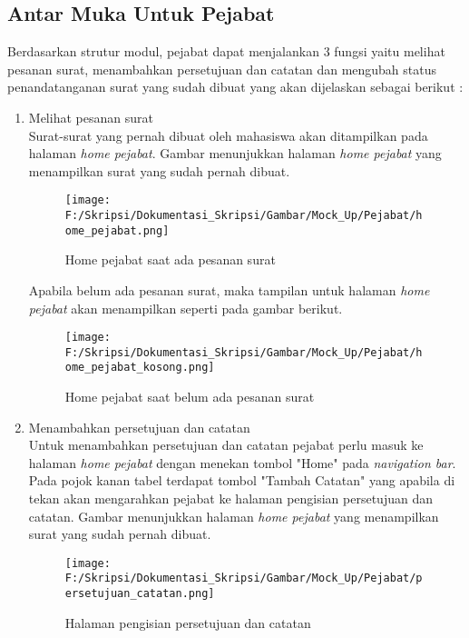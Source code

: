 \subsection{Antar Muka Untuk Pejabat}
\label{sec:antar_muka_pejabat}
Berdasarkan strutur modul, pejabat dapat menjalankan 3 fungsi yaitu melihat pesanan surat, menambahkan persetujuan dan catatan dan mengubah status penandatanganan surat yang sudah dibuat yang akan dijelaskan sebagai berikut :
\begin{enumerate}
	\item Melihat pesanan surat\\
	Surat-surat yang pernah dibuat oleh mahasiswa akan ditampilkan pada halaman \textit{home pejabat}. Gambar menunjukkan halaman \textit{home pejabat} yang menampilkan surat yang sudah pernah dibuat.
	\begin{figure}[H]
	\centering
		\texttt{[image: F:/Skripsi/Dokumentasi\_Skripsi/Gambar/Mock\_Up/Pejabat/home\_pejabat.png]}
		\caption{Home pejabat saat ada pesanan surat}
		\label{fig:home_mahasiswa_yang_pernah_membuat_surat}
	\end{figure}
	
	Apabila belum ada pesanan surat, maka tampilan untuk halaman \textit{home pejabat} akan menampilkan seperti pada gambar berikut. 
	\begin{figure}[H]
	\centering
		\texttt{[image: F:/Skripsi/Dokumentasi\_Skripsi/Gambar/Mock\_Up/Pejabat/home\_pejabat\_kosong.png]}
		\caption{Home pejabat saat belum ada pesanan surat}
		\label{fig:home_mahasiswa_yang_belum_pernah_membuat_surat}
	\end{figure}
	
	\item Menambahkan persetujuan dan catatan\\
	Untuk menambahkan persetujuan dan catatan pejabat perlu masuk ke halaman \textit{home pejabat} dengan menekan tombol "Home" pada \textit{navigation bar}. Pada pojok kanan tabel terdapat tombol "Tambah Catatan" yang apabila di tekan akan mengarahkan pejabat ke halaman pengisian persetujuan dan catatan. Gambar menunjukkan halaman \textit{home pejabat} yang menampilkan surat yang sudah pernah dibuat.
	\begin{figure}[H]
	\centering
		\texttt{[image: F:/Skripsi/Dokumentasi\_Skripsi/Gambar/Mock\_Up/Pejabat/persetujuan\_catatan.png]}
		\caption{Halaman pengisian persetujuan dan catatan}
		\label{fig:halaman_pengisian_persetujuan_dan_catatan}
	\end{figure}
	

\end{enumerate}
